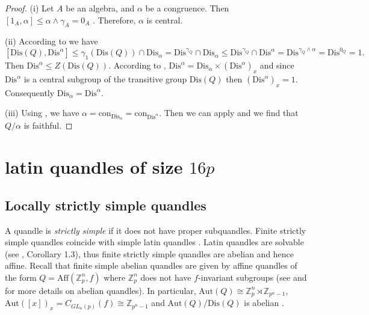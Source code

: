 \documentclass[a4paper, english, 9pt]{amsart}
\theoremstyle{plain}
\theoremstyle{definition}
\def\aut#1{\mathrm{Aut}(#1)}
\def\Aff#1{\mathrm{Aff}#1}
\def\dis{\mathrm{Dis}}
\def\c#1{\mathrm{con}_{#1}}
\def\Z{\mathbb Z}
\def\LSS{\mathcal{LSS}}
\begin{document}
\begin{proof}
(i) Let $A$ be an algebra, and $\alpha$ be a congruence. Then $[1_A,\alpha]\leq \alpha\wedge \gamma_A=0_A$ \cite[Proposition 3.4]{comm}. Therefore, $\alpha$ is central.

(ii) According to \cite[Proposition 3.3(i)]{CP} we have
$$[\dis(Q),\dis^\alpha]\leq \gamma_1(\dis(Q))\cap \dis_\alpha=\dis^{\gamma_Q}\cap \dis_\alpha\leq \dis^{\gamma_Q}\cap \dis^\alpha=\dis^{\gamma_Q\wedge \alpha}=\dis^{0_Q}=1.$$
Then $\dis^\alpha\leq Z(\dis(Q))$. According to \cite[Lemma 4.4(i)]{Nilpotent}, $\dis^\alpha=\dis_\alpha\times \left(\dis^\alpha\right)_x$ and since $\dis^\alpha$ is a central subgroup of the transitive group $\dis(Q)$ then $\left(\dis^\alpha\right)_x=1$. Consequently $\dis_\alpha=\dis^\alpha$. 

(iii) Using \cite[Corollary 4.5(i)]{Nilpotent}, we have $\alpha=\c{\dis_\alpha}=\c{\dis^\alpha}$. Then we can apply \cite[Proposition 3.7]{CP} and we find that $Q/\alpha$ is faithful.
\end{proof}


\section{latin quandles of size \texorpdfstring{$16p$}{16p}} \label{sec:latin16p}


\subsection{Locally strictly simple quandles}
A quandle is {\it strictly simple} if it does not have proper subquandles. Finite strictly simple quandles coincide with simple latin quandles \cite{Principal}. Latin quandles are solvable (see \cite{CP}, Corollary 1.3), thus finite strictly simple quandles are abelian and hence affine. Recall that finite simple abelian quandles are given by affine quandles of the form $Q=\Aff(\Z_p^n,f)$ where $\Z_p^n$ does not have $f$-invariant subgroups (see \cite{Principal} and \cite{Medial} for more details on abelian quandles). In particular, $\aut{Q}\cong \Z_p^n\rtimes \Z_{p^n-1}$, $\aut{[x]}_x= C_{GL_n(p)}(f)\cong \Z_{p^n-1}$ and $\aut{Q}/\dis(Q)$ is abelian \cite[Proposition 3.8]{Principal}. %
\end{document}
